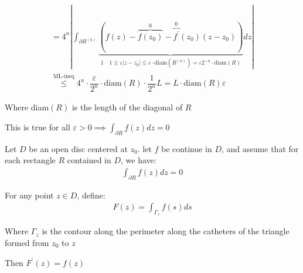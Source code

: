 \begin{prf}[]{}
\begin{equation*}
\begin{gathered}
      = 4^n\left|\int_{\partial R^{(n)}}\underbrace{\left(f(z)-\overbrace{f(z_0)}^{\text{0}}-\overbrace{f^{\prime}}^{\text{0}}(z_0)(z-z_0)\right)}_{\text{$1\quad 1\leq\varepsilon\left|z-z_0\right|\leq\varepsilon\cdot\text{diam}(R^{(n)})=\varepsilon2^{-n}\cdot\text{diam}(R)$}}dz\right|\\
      \stackrel{\text{ML-ineq}}{\leq} 4^n\cdot\dfrac{\varepsilon}{2^n}\cdot\text{diam}(R)\cdot\dfrac{1}{2^n}L = L\cdot\text{diam}(R)\varepsilon
    \end{gathered}
  \end{equation*}
  \par\bigskip
  \noindent Where diam$(R)$ is the length of the diagonal of $R$
  \par\bigskip
  \noindent This is true for all $\varepsilon>0\implies \int_{\partial R}f(z)dz = 0$
\end{prf}
\par\bigskip
\begin{theo}[]{}
  Let $D$ be an open disc centered at $z_0$. let $f$ be continue in $D$, and assume that for each rectangle $R$ contained in $D$, we have:
  \begin{equation*}
    \begin{gathered}
      \int_{\partial R}f(z)dz = 0
    \end{gathered}
  \end{equation*}\par
  \noindent For any point $z\in D$, define:
  \begin{equation*}
    \begin{gathered}
      F(z) = \int_{\Gamma_z}f(s)ds
    \end{gathered}
  \end{equation*}\par
  \noindent Where $\Gamma_z$ is the contour along the perimeter along the catheters of the triangle formed from $z_0$ to $z$
  \par\bigskip
  \noindent Then $F^{\prime}(z) = f(z)$
\end{theo}
\par\bigskip
